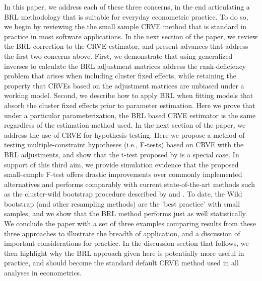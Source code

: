 \documentclass[12pt]{article}
\begin{document}
In this paper, we address each of these three concerns, in the end articulating a BRL methodology that is suitable for everyday econometric practice. 
To do so, we begin by reviewing the the small sample CRVE method that is standard in practice in most software applications. 
In the next section of the paper, we review the BRL correction to the CRVE estimator, and present advances that address the first two concerns above. 
First, we demonstrate that using generalized inverses to calculate the BRL adjustment matrices address the rank-deficiency problem that arises when including cluster fixed effects, while retaining the property that CRVEs based on the adjustment matrices are unbiased under a working model. 
Second, we describe how to apply BRL when fitting models that absorb the cluster fixed effects prior to parameter estimation. 
Here we prove that under a particular parameterization, the BRL based CRVE estimator is the same regardless of the estimation method used.
In the next section of the paper, we address the use of CRVE for hypothesis testing.
Here we propose a method of testing multiple-constraint hypotheses (i.e., F-tests) based on CRVE with the BRL adjustments, and show that the t-test proposed by \citet{Bell2002bias} is a special case. 
In support of this third aim, we provide simulation evidence that the proposed small-sample F-test offers drastic improvements over commonly implemented alternatives and performs comparably with current state-of-the-art methods such as the cluster-wild bootstrap procedure described by \citet{Cameron2008bootstrap} and \citet{Webb2013wild}. 
To date, the Wild bootstrap (and other resampling methods) are the 'best practice' with small samples, and we show that the BRL method performs just as well statistically.
We conclude the paper with a set of three examples comparing results from these three approaches to illustrate the breadth of application, and a discussion of important considerations for practice.  
In the discussion section that follows, we then highlight why the BRL approach given here is potentially more useful in practice, and should become the standard default CRVE method used in all analyses in econometrics.

\end{document}
